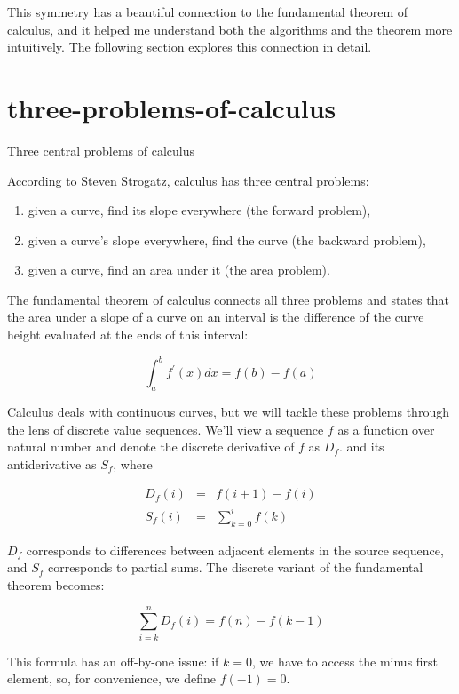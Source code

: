 \documentclass{article}
\begin{document}
This symmetry has a beautiful connection to the fundamental theorem of calculus,
and it helped me understand both the algorithms and the theorem more intuitively.
The following section explores this connection in detail.

\section{three-problems-of-calculus}{Three central problems of calculus}

According to Steven Strogatz, calculus has three central problems:
\begin{enumerate}
\item given a curve, find its slope everywhere (the forward problem),
\item given a curve’s slope everywhere, find the curve (the backward problem),
\item given a curve, find an area under it (the area problem).
\end{enumerate}

The fundamental theorem of calculus connects all three problems
and states that the area under a slope of a curve on an interval
is the difference of the curve height evaluated at the ends of this interval:

\[\int_a^b f^{\prime}(x) dx = f(b) - f(a)\]

Calculus deals with continuous curves, but we will tackle these problems through the lens of discrete value sequences.
We'll view a sequence $f$ as a function over natural number
and denote the discrete derivative of $f$ as $D_f$.
and its antiderivative as $S_f$, where

\begin{align*}
  D_f(i) &=& f(i+1) - f(i) \\
  S_f(i) &=& \sum_{k=0}^i f(k)
\end{align*}

$D_f$ corresponds to differences between adjacent elements in the source sequence,
and $S_f$ corresponds to partial sums.
The discrete variant of the fundamental theorem becomes:

\[ \sum_{i=k}^n D_f(i) = f(n) - f(k-1) \]

\label{off-by-one}
This formula has an off-by-one issue:
if $k = 0$,
we have to access the minus first element, so, for convenience,
we define $f(-1) = 0$.
\end{document}
